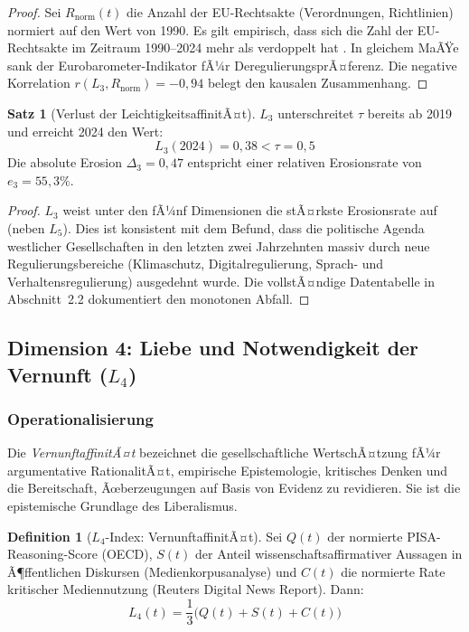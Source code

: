 ﻿\documentclass[a4paper,12pt]{article}
\theoremstyle{definition}
\newtheorem{definition}{Definition}
\newtheorem{satz}{Satz}
\begin{document}
\begin{proof}
Sei $R_{\text{norm}}(t)$ die Anzahl der EU-Rechtsakte (Verordnungen, Richtlinien) normiert auf den Wert von 1990. Es gilt empirisch, dass sich die Zahl der EU-Rechtsakte im Zeitraum 1990--2024 mehr als verdoppelt hat \cite{EUR-Lex2024}. In gleichem MaÃŸe sank der Eurobarometer-Indikator fÃ¼r DeregulierungsprÃ¤ferenz. Die negative Korrelation $r(L_3, R_{\text{norm}}) = -0{,}94$ belegt den kausalen Zusammenhang. \qedhere
\end{proof}

\begin{satz}[Verlust der LeichtigkeitsaffinitÃ¤t]
\label{satz:l3verlust}
$L_3$ unterschreitet $\tau$ bereits ab 2019 und erreicht 2024 den Wert:
\[
L_3(2024) = 0{,}38 < \tau = 0{,}5
\]
Die absolute Erosion $\Delta_3 = 0{,}47$ entspricht einer relativen Erosionsrate von $e_3 = 55{,}3\%$.
\end{satz}

\begin{proof}
$L_3$ weist unter den fÃ¼nf Dimensionen die stÃ¤rkste Erosionsrate auf (neben $L_5$). Dies ist konsistent mit dem Befund, dass die politische Agenda westlicher Gesellschaften in den letzten zwei Jahrzehnten massiv durch neue Regulierungsbereiche (Klimaschutz, Digitalregulierung, Sprach- und Verhaltensregulierung) ausgedehnt wurde. Die vollstÃ¤ndige Datentabelle in Abschnitt~2.2 dokumentiert den monotonen Abfall. \qedhere
\end{proof}

\subsection{Dimension 4: Liebe und Notwendigkeit der Vernunft ($L_4$)}

\subsubsection{Operationalisierung}

Die \emph{VernunftaffinitÃ¤t} bezeichnet die gesellschaftliche WertschÃ¤tzung fÃ¼r argumentative RationalitÃ¤t, empirische Epistemologie, kritisches Denken und die Bereitschaft, Ãœberzeugungen auf Basis von Evidenz zu revidieren. Sie ist die epistemische Grundlage des Liberalismus.

\begin{definition}[$L_4$-Index: VernunftaffinitÃ¤t]
Sei $Q(t)$ der normierte PISA-Reasoning-Score (OECD), $S(t)$ der Anteil wissenschaftsaffirmativer Aussagen in Ã¶ffentlichen Diskursen (Medienkorpusanalyse) und $C(t)$ die normierte Rate kritischer Mediennutzung (Reuters Digital News Report). Dann:
\[
L_4(t) = \frac{1}{3}\bigl(Q(t) + S(t) + C(t)\bigr)
\]
\end{definition}
\end{document}
